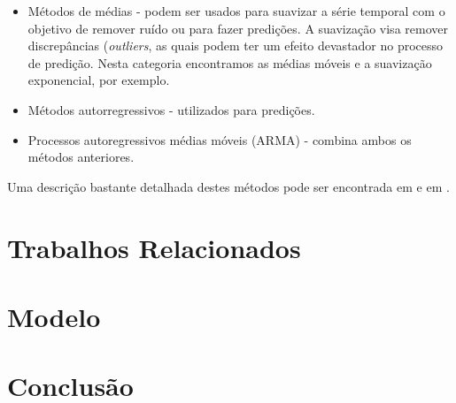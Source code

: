 \documentclass[twoside,english,brazilian]{UNISINOSmonografia}
\begin{document}
\begin{itemize}
	\item Métodos de médias - podem ser usados para suavizar a série temporal com o objetivo de remover ruído ou para fazer predições. A suavização visa remover discrepâncias (\textit{outliers}, as quais podem ter um efeito devastador no processo de predição. Nesta categoria encontramos as médias móveis e a suavização exponencial, por exemplo.
	\item Métodos autorregressivos - utilizados para predições. %
	\item Processos autoregressivos médias móveis (ARMA) - combina ambos os métodos anteriores.
\end{itemize}
Uma descrição bastante detalhada destes métodos pode ser encontrada em \cite{Lee2009} e em \cite{Shumway2000}.

\chapter{Trabalhos Relacionados}


\chapter{Modelo}

\chapter{Conclusão}




\appendix
\end{document}
